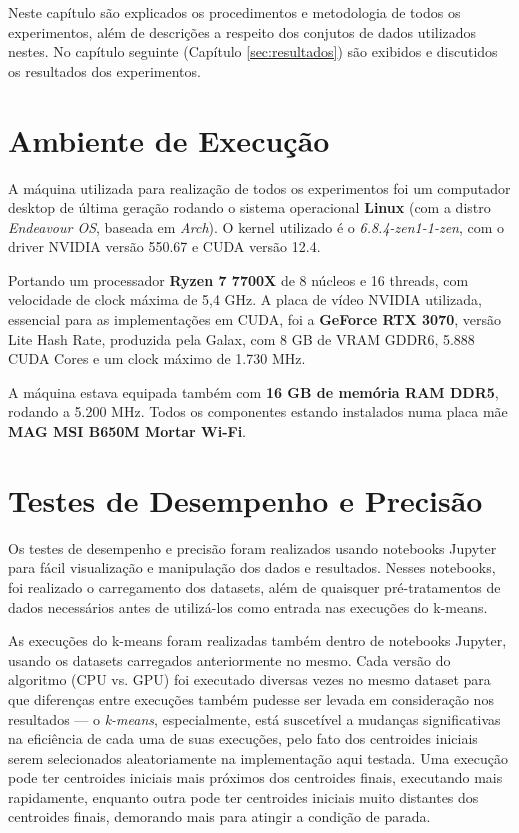 \documentclass[12pt,
openright, 
oneside, %
a4paper,    %
brazil]{facom-ufu-abntex2}
\begin{document}
Neste capítulo são explicados os procedimentos e metodologia de todos os experimentos, além de descrições a respeito dos conjutos de dados utilizados nestes. No capítulo seguinte (Capítulo \ref{sec:resultados}) são exibidos e discutidos os resultados dos experimentos.




\section{Ambiente de Execução}
\label{sec:máquinaUtilizada}

A máquina utilizada para realização de todos os experimentos foi um computador desktop de última geração rodando o sistema operacional \textbf{Linux} (com a distro \textit{Endeavour OS}, baseada em \textit{Arch}). O kernel utilizado é o \textit{6.8.4-zen1-1-zen}, com o driver NVIDIA versão 550.67 e CUDA versão 12.4.

Portando um processador \textbf{Ryzen 7 7700X} de 8 núcleos e 16 threads, com velocidade de clock máxima de 5,4 GHz. A placa de vídeo NVIDIA utilizada, essencial para as implementações em CUDA, foi a \textbf{GeForce RTX 3070}, versão Lite Hash Rate, produzida pela Galax, com 8 GB de VRAM GDDR6, 5.888 CUDA Cores e um clock máximo de 1.730 MHz.

A máquina estava equipada também com \textbf{16 GB de memória RAM DDR5}, rodando a 5.200 MHz. Todos os componentes estando instalados numa placa mãe \textbf{MAG MSI B650M Mortar Wi-Fi}.




\section{Testes de Desempenho e Precisão}

Os testes de desempenho e precisão foram realizados usando notebooks Jupyter para fácil visualização e manipulação dos dados e resultados. Nesses notebooks, foi realizado o carregamento dos datasets, além de quaisquer pré-tratamentos de dados necessários antes de utilizá-los como entrada nas execuções do k-means.

As execuções do k-means foram realizadas também dentro de notebooks Jupyter, usando os datasets carregados anteriormente no mesmo. Cada versão do algoritmo (CPU vs. GPU) foi executado diversas vezes no mesmo dataset para que diferenças entre execuções também pudesse ser levada em consideração nos resultados — o \textit{k-means}, especialmente, está suscetível a mudanças significativas na eficiência de cada uma de suas execuções, pelo fato dos centroides iniciais serem selecionados aleatoriamente na implementação aqui testada. Uma execução pode ter centroides iniciais mais próximos dos centroides finais, executando mais rapidamente, enquanto outra pode ter centroides iniciais muito distantes dos centroides finais, demorando mais para atingir a condição de parada.
\end{document}
